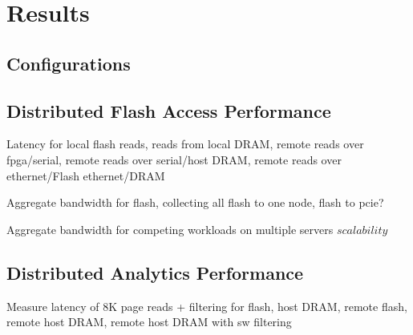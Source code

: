 \section{Results}
\subsection{Configurations}

\subsection{Distributed Flash Access Performance}
Latency for local flash reads, reads from local DRAM, remote reads over
fpga/serial, remote reads over serial/host DRAM, remote reads over
ethernet/Flash ethernet/DRAM

Aggregate bandwidth for flash, collecting all flash to one node, flash to pcie?

Aggregate bandwidth for competing workloads on multiple servers \(scalability\)

\subsection{Distributed Analytics Performance}

Measure latency of 8K page reads + filtering for flash, host DRAM, remote flash,
remote host DRAM, remote host DRAM with sw filtering

